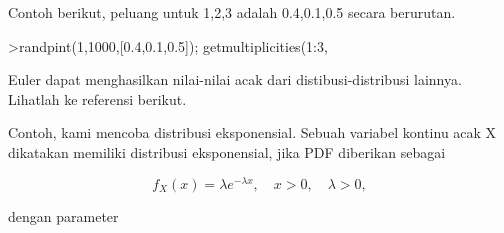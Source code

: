 \documentclass[a4paper,10pt]{article}
\begin{document}
\begin{eulernotebook}
\begin{eulercomment}
Contoh berikut, peluang untuk 1,2,3 adalah 0.4,0.1,0.5 secara berurutan.
\end{eulercomment}
\begin{eulerprompt}
>randpint(1,1000,[0.4,0.1,0.5]); getmultiplicities(1:3,%
\end{eulerprompt}
\begin{euleroutput}
  [378,  102,  520]
\end{euleroutput}
\begin{eulercomment}
Euler dapat menghasilkan nilai-nilai acak dari distibusi-distribusi lainnya. Lihatlah ke
referensi berikut.

Contoh, kami mencoba distribusi eksponensial. Sebuah variabel kontinu acak X dikatakan
memiliki distribusi eksponensial, jika PDF diberikan sebagai

\end{eulercomment}
\begin{eulerformula}
\[
f_X(x)=\lambda e^{-\lambda x},\quad x>0,\quad \lambda>0,
\]
\end{eulerformula}
\begin{eulercomment}
dengan parameter


\end{eulercomment}
\end{eulernotebook}
\end{document}
